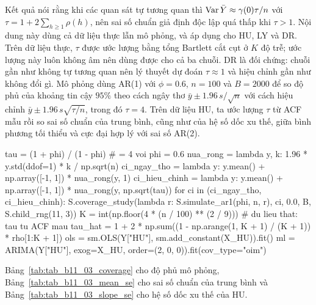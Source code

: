  Kết quả  nói rằng khi các quan sát tự tương quan thì $\operatorname{Var}\bar Y\approx\gamma(0)\tau/n$ với $\tau=1+2\sum_{h\ge1}\rho(h)$, nên sai số chuẩn giả định độc lập quá thấp khi $\tau>1$.
 Nội dung này dùng cả dữ liệu thực lẫn mô phỏng, và áp dụng cho HU, LY và DR. Trên dữ liệu thực, $\tau$ được ước lượng bằng tổng Bartlett cắt cụt ở $K$ độ trễ; ước lượng này luôn không âm nên dùng được cho cả ba chuỗi. DR là đối chứng: chuỗi gần như không tự tương quan nên lý thuyết dự đoán $\tau\approx1$ và hiệu chỉnh gần như không đổi gì. Mô phỏng dùng AR(1) với $\phi=0.6$, $n=100$ và $B=2000$ để so độ phủ của khoảng tin cậy $95\%$ theo cách ngây thơ $\bar y\pm1.96\,s/\sqrt n$ với cách hiệu chỉnh $\bar y\pm1.96\,s\sqrt{\tau/n}$, trong đó $\tau=4$. Trên dữ liệu HU, ta ước lượng $\tau$ từ ACF mẫu rồi so sai số chuẩn của trung bình, cũng như của hệ số dốc xu thế, giữa bình phương tối thiểu và cực đại hợp lý với sai số AR(2).
\begin{codeblock}
tau = (1 + phi) / (1 - phi)                                    # = 4 voi phi = 0.6
nua_rong = lambda y, k: 1.96 * y.std(ddof=1) * k / np.sqrt(n)
ci_ngay_tho = lambda y: y.mean() + np.array([-1, 1]) * nua_rong(y, 1)
ci_hieu_chinh = lambda y: y.mean() + np.array([-1, 1]) * nua_rong(y, np.sqrt(tau))
for ci in (ci_ngay_tho, ci_hieu_chinh):
    S.coverage_study(lambda r: S.simulate_ar1(phi, n, r), ci, 0.0, B, S.child_rng(11, 3))
K = int(np.floor(4 * (n / 100) ** (2 / 9)))                    # du lieu that: tau tu ACF mau
tau_hat = 1 + 2 * np.sum((1 - np.arange(1, K + 1) / (K + 1)) * rho[1:K + 1])
ols = sm.OLS(Y["HU"], sm.add_constant(X_HU)).fit()
ml = ARIMA(Y["HU"], exog=X_HU, order=(2, 0, 0)).fit(cov_type="oim")
\end{codeblock}
 Bảng~\ref{tab:tab_b11_03_coverage} cho độ phủ mô phỏng, Bảng~\ref{tab:tab_b11_03_mean_se} cho sai số chuẩn của trung bình và Bảng~\ref{tab:tab_b11_03_slope_se} cho hệ số dốc xu thế của HU.



